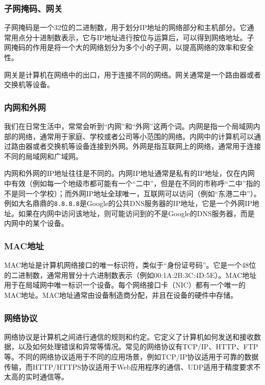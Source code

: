 \documentclass[../main.tex]{subfiles}
\begin{document}
\subsubsection{子网掩码、网关}

子网掩码是一个32位的二进制数，用于划分IP地址的网络部分和主机部分。它通常用点分十进制数表示，它与IP地址进行按位与运算后，可以得到网络地址。子网掩码的作用是将一个大的网络划分为多个小的子网，以提高网络的效率和安全性。

网关是计算机在网络中的出口，用于连接不同的网络。网关通常是一个路由器或者交换机等设备。

\subsubsection{内网和外网}

我们在日常生活中，常常会听到“内网”和“外网”这两个词。内网是指一个局域网内部的网络，通常用于家庭、学校或者公司等小范围的网络。内网中的计算机可以通过路由器或者交换机等设备连接到外网。外网是指互联网上的网络，通常用于连接不同的局域网和广域网。

内网和外网的IP地址往往是不同的。内网IP地址通常是私有的IP地址，仅在内网中有效（例如每一个地级市都可能有一个“二中”，但是在不同的市称呼“二中”指的不是同一个学校）；而外网IP地址全球唯一，互联网可以访问（例如“东港二中”）。例如大名鼎鼎的\texttt{8.8.8.8}是Google的公共DNS服务器的IP地址，它是一个外网IP地址。如果在内网中访问该地址，则可能访问到的不是Google的DNS服务器，而是内网中的某个设备。

\subsubsection{MAC地址}

MAC地址是计算机网络接口的唯一标识符，类似于“身份证号码”。它是一个48位的二进制数，通常用冒分十六进制数表示（例如00:1A:2B:3C:4D:5E）。MAC地址用于在局域网中唯一标识一个设备。每个网络接口卡（NIC）都有一个唯一的MAC地址。MAC地址通常由设备制造商分配，并且在设备的硬件中存储。

\subsubsection{网络协议}

网络协议是计算机之间进行通信的规则和约定。它定义了计算机如何发送和接收数据，以及如何处理错误和异常等情况。常见的网络协议有TCP/IP、HTTP、FTP等。不同的网络协议适用于不同的应用场景，例如TCP/IP协议适用于可靠的数据传输，而HTTP/HTTPS协议适用于Web应用程序的通信、UDP适用于精度要求不太高的实时通信等。
\end{document}
